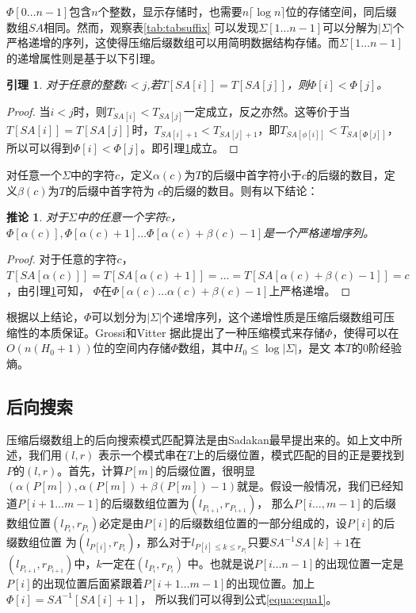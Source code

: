 \documentclass[UTF8,adobefonts]{ctexart}
\newtheorem{lemma}{引理}[section]
\newtheorem{corollary}[theorem]{推论}
\begin{document}
$\Phi[0\ldots n-1]$包含$n$个整数，显示存储时，也需要$n\lceil \log n \rceil$位的存储空间，同后缀数组$SA$相同。然而，观察表\ref{tab:tabsuffix}
可以发现$\Sigma[1\ldots n-1]$可以分解为$|\Sigma|$个严格递增的序列，这使得压缩后缀数组可以用简明数据结构存储。而$\Sigma[1\ldots n-1]$
的递增属性则是基于以下引理。

\begin{lemma}\label{ref:lem1}
对于任意的整数$i<j$,若$T[SA[i]]=T[SA[j]]$，则$\Phi[i]<\Phi[j]$。
\end{lemma}

\begin{proof}
    当$i<j$时，则$T_{SA[i]}<T_{SA[j]}$一定成立，反之亦然。这等价于当$T[SA[i]]=T[SA[j]]$时，$T_{SA[i]+1}<T_{SA[j]+1}$，即$T_{SA[\phi[i]]}<T_{SA[\Phi[j]]}$，
    所以可以得到$\Phi[i]<\Phi[j]$。即引理\ref{ref:lem1}成立。
\end{proof}

对任意一个$\Sigma$中的字符$c$，定义$\alpha(c)$为$T$的后缀中首字符小于$c$的后缀的数目，定义$\beta(c)$为$T$的后缀中首字符为
$c$的后缀的数目。则有以下结论：

\begin{corollary}\label{cor1}
对于$\Sigma$中的任意一个字符$c$，$\Phi[\alpha(c)], \Phi[\alpha(c)+1] \ldots \Phi[\alpha(c)+\beta(c)− 1]$是一个严格递增序列。
\end{corollary}

\begin{proof}
    对于任意的字符$c$，$T[SA[\alpha(c)]]=T[SA[\alpha(c)+1]]=\ldots =T[SA[\alpha(c)+\beta(c)-1]]=c$，由引理\ref{ref:lem1}可知，
    $\Phi$在$\Phi[\alpha(c)\ldots \alpha(c)+\beta(c)-1]$上严格递增。
\end{proof}

根据以上结论，$\Phi$可以划分为$|\Sigma|$个递增序列，这个递增性质是压缩后缀数组可压缩性的本质保证。Grossi和Vitter\cite{grossi2005compressed}
据此提出了一种压缩模式来存储$\Phi$，使得可以在$O(n(H_0+1))$位的空间内存储$\Phi$数组，其中$H_0 \leq \log |\Sigma|$，是文
本$T$的0阶经验熵。

\subsection{后向搜索}

压缩后缀数组上的后向搜索模式匹配算法是由Sadakan最早提出来的\cite{sadakane2002succinct}。如上文中所述，我们用$(l,r)$
表示一个模式串在$T$上的后缀位置，模式匹配的目的正是要找到$P$的$(l,r)$。首先，计算$P[m]$的后缀位置，很明显$(\alpha(P[m]),
\alpha(P[m])+\beta(P[m])-1)$就是。假设一般情况，我们已经知道$P[i+1\ldots m-1]$的后缀数组位置为$(l_{P_{i+1}},r_{P_{i+1}})$，
那么$P[i\ldots,m-1]$的后缀数组位置$(l_{P_i},r_{P_i})$必定是由$P[i]$的后缀数组位置的一部分组成的，设$P[i]$的后缀数组位置
为$(l_{P[i]},r_{P_i})$，那么对于$l_{P[i]\leq k \leq r_{P_i}}$只要$SA^{-1}SA[k]+1$在$(l_{P_{i+1}},r_{P_{i+1}})$中，$k$一定在$(l_{P_i},r_{P_i})$
中。也就是说$P[i\ldots n-1]$的出现位置一定是$P[i]$的出现位置后面紧跟着$P[i+1\ldots m-1]$的出现位置。加上$\Phi[i]=SA^{-1}[SA[i]+1]$，
所以我们可以得到公式\ref{equa:equa1}。
\end{document}
